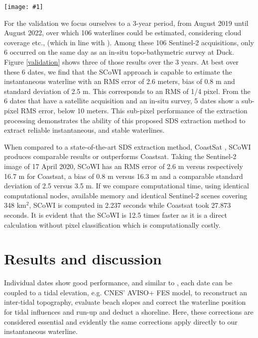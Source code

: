\documentclass[remotesensing,article,submit,pdftex,moreauthors]{Definitions/mdpi}
\newcommand{\myfigure}[4]{
    \begin{figure*}[ht!]
        \centering
        \texttt{[image: \#1]}	 
        \caption{\itshape#2}
        \label{#3}
    \end{figure*} 
}
\begin{document}
\myfigure{img/Results.png}{Comparison of waterline extracted using the new SCoWI-based extraction method (shoreliner) proposed in this paper (green line) with the in-situ measured waterline (red line). The right-hand side histograms display the positional error between the extracted and measured waterline. The smallest the cross-shore RMS error achieved a value of 2.6 meters corresponding to 1/4 of the Sentinel-2 pixel.}{validation}{1}

For the validation we focus ourselves to a 3-year period, from August 2019 until August 2022, over which 106 waterlines could be estimated, considering cloud coverage etc., (which in line with \citep{BERGSMA2020}). Among these 106 Sentinel-2 acquisitions, only 6 occurred on the same day as an in-situ topo-bathymetric survey at Duck. Figure \ref{validation} shows three of those results over the 3 years. At best over these 6 dates, we find that the SCoWI approach is capable to estimate the instantaneous waterline with an RMS error of 2.6 meters, bias of 0.8 m and standard deviation of 2.5 m. This corresponds to an RMS of 1/4 pixel. From the 6 dates that have a satellite acquisition and an in-situ survey, 5 dates show a sub-pixel RMS error, below 10 meters. This sub-pixel performance of the extraction processing demonstrates the ability of this proposed SDS extraction method to extract reliable instantaneous, and stable waterlines.

When compared to a state-of-the-art SDS extraction method, CoastSat \citep{VOS2019_sub}, SCoWI produces comparable results or outperforms Coastsat. Taking the Sentinel-2 image of 17 April 2020, SCoWI has an RMS error of 2.6 m versus respectively 16.7 m for Coastsat, a bias of 0.8 m versus 16.3 m and a comparable standard deviation of 2.5 versus 3.5 m. If we compare computational time, using identical computational nodes, available memory and identical Sentinel-2 scenes covering 348 km$^2$, SCoWI is computed in 2.237 seconds while Coastsat took 27.873 seconds. It is evident that the SCoWI is 12.5 times faster as it is a direct calculation without pixel classification which is computationally costly.


\section{Results and discussion}
Individual dates show good performance, and similar to \citet{VOS2019_google}, each date can be coupled to a tidal elevation, e.g. CNES' AVISO+ FES model, to reconstruct an inter-tidal topography, evaluate beach slopes and correct the waterline position for tidal influences and run-up and deduct a shoreline. Here, these corrections are considered essential and evidently the same corrections apply directly to our instantaneous waterline. 
\end{document}
